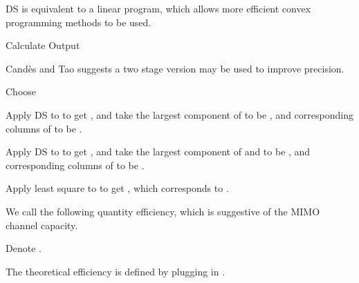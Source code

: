 {
\I DS is equivalent to a linear program, which allows more efficient convex programming methods to be used.

\I Calculate
\I Output 
}
{
\I Candès and Tao suggests a two stage version may be used to improve precision.

\I Choose 

\I Apply DS to  to get , and take the  largest component of  to be , and corresponding columns of  to be .

\I Apply DS to  to get , and take the  largest component of  and to be , and corresponding columns of  to be .

\I Apply least square to  to get , which corresponds to .
}
{
\I We call the following quantity \m {\chi} efficiency, which is suggestive of the MIMO channel capacity.

\I Denote .

\I The theoretical efficiency  is defined by plugging in .
}
{
\blank [big]
}
{
\blank [big]
}
